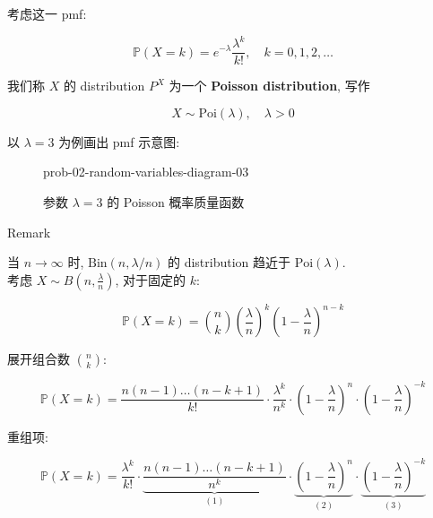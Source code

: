 \begin{example}

考虑这一 pmf:

\[\mathbb{P}(\mathit{X} = \mathit{k}) = \mathit{e}^{- \mathit{\lambda}}\frac{\mathit{\lambda}^{\mathit{k}}}{\mathit{k}!},\quad\mathit{k} = 0,1,2,\ldots\]

我们称 \(\mathit{X}\) 的 distribution \(\mathit{P}^{\mathit{X}}\) 为一个 \textbf{Poisson distribution}, 写作

\[\mathit{X} \sim \text{Poi}(\mathit{\lambda}),\quad\mathit{\lambda} > 0\]

以 \(\mathit{\lambda} = 3\) 为例画出 pmf 示意图:

\begin{figure}[htbp]
\centering
\begin{qldrawing}
\csname prob-02-random-variables-diagram-03\endcsname
\end{qldrawing}

\caption{参数 \(\mathit{\lambda} = 3\) 的 Poisson 概率质量函数}

\label{fig-prob-02-random-variables-diagram-03}

\end{figure}

\begin{qlremark}{Remark}

当 \(\mathit{n}\rightarrow\infty\) 时, \(\text{Bin}(\mathit{n},\mathit{\lambda}/\mathit{n})\) 的 distribution 趋近于 \(\text{Poi}(\mathit{\lambda})\).\\
考虑 \(\mathit{X} \sim \mathit{B}\left( {\mathit{n},\frac{\mathit{\lambda}}{\mathit{n}}} \right)\), 对于固定的 \(\mathit{k}\):

\[\mathbb{P}(\mathit{X} = \mathit{k}) = \binom{\mathit{n}}{\mathit{k}}\left( \frac{\mathit{\lambda}}{\mathit{n}} \right)^{\mathit{k}}\left( {1 - \frac{\mathit{\lambda}}{\mathit{n}}} \right)^{\mathit{n} - \mathit{k}}\]

展开组合数 \(\binom{\mathit{n}}{\mathit{k}}\):

\[\mathbb{P}(\mathit{X} = \mathit{k}) = \frac{\mathit{n}(\mathit{n} - 1)\ldots(\mathit{n} - \mathit{k} + 1)}{\mathit{k}!} \cdot \frac{\mathit{\lambda}^{\mathit{k}}}{\mathit{n}^{\mathit{k}}} \cdot \left( {1 - \frac{\mathit{\lambda}}{\mathit{n}}} \right)^{\mathit{n}} \cdot \left( {1 - \frac{\mathit{\lambda}}{\mathit{n}}} \right)^{- \mathit{k}}\]

重组项:

\[\mathbb{P}(\mathit{X} = \mathit{k}) = \frac{\mathit{\lambda}^{\mathit{k}}}{\mathit{k}!} \cdot \underset{(1)}{\underbrace{\frac{\mathit{n}(\mathit{n}-1)\ldots(\mathit{n}-\mathit{k}+1)}{\mathit{n}^{\mathit{k}}}}} \cdot \underset{(2)}{\underbrace{\left( {1-\frac{\mathit{\lambda}}{\mathit{n}}} \right)^{\mathit{n}}}} \cdot \underset{(3)}{\underbrace{\left( {1-\frac{\mathit{\lambda}}{\mathit{n}}} \right)^{-\mathit{k}}}}\]


\end{qlremark}
\end{example}
